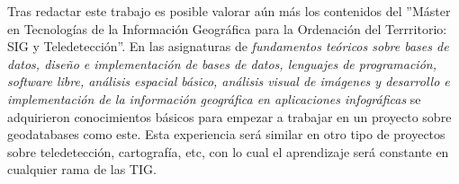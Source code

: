 Tras redactar este trabajo es posible valorar aún más los contenidos del ''Máster en Tecnologías de la Información Geográfica para la Ordenación del Terrritorio: SIG y Teledetección''. En las asignaturas de \textit{fundamentos teóricos sobre bases de datos, diseño e implementación de bases de datos, lenguajes de programación, software libre, análisis espacial básico, análisis visual de imágenes y desarrollo e implementación de la información geográfica en aplicaciones infográficas} se adquirieron conocimientos básicos para empezar a trabajar en un proyecto sobre geodatabases como este. Esta experiencia será similar en otro tipo de proyectos sobre teledetección, cartografía, etc, con lo cual el aprendizaje será constante en cualquier rama de las TIG.
